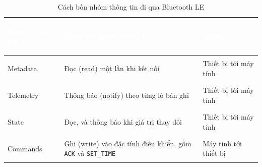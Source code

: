 \begin{table}[H]
    \centering
    \renewcommand{\arraystretch}{1.5}
    \caption{Cách bốn nhóm thông tin đi qua Bluetooth LE}
    \label{tab:gatt}
    \begin{tabular}{>{\bfseries\raggedright\arraybackslash}m{3.0cm} >{\raggedright\arraybackslash}m{5.4cm} >{\raggedright\arraybackslash}m{5.8cm}}
        \toprule
        \rowcolor{haitayblue}
        \textcolor{white}{Nhóm thông tin} & \textcolor{white}{Thao tác Bluetooth LE} & \textcolor{white}{Hướng} \\
        \midrule
        \rowcolor{haitayblue!8}
        Metadata & Đọc (read) một lần khi kết nối & Thiết bị tới máy tính \\
        Telemetry & Thông báo (notify) theo từng lô bản ghi & Thiết bị tới máy tính \\
        \rowcolor{haitayblue!8}
        State & Đọc, và thông báo khi giá trị thay đổi & Thiết bị tới máy tính \\
        Commands & Ghi (write) vào đặc tính điều khiển, gồm \texttt{ACK} và \texttt{SET\_TIME} & Máy tính tới thiết bị \\
        \bottomrule
    \end{tabular}
\end{table}
